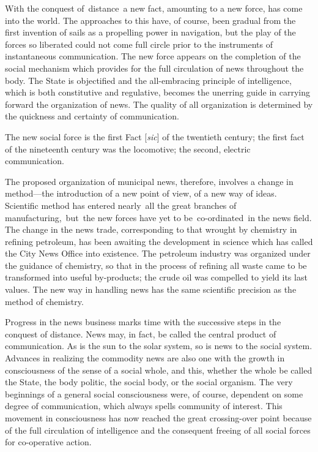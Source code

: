\documentclass[twoside,symmetric,nobib,justified]{tufte-book}
\begin{document}
With the conquest of~distance~a new fact, amounting to a new force, has
come into the world. The approaches to this have, of course, been
gradual from the first invention of sails as a propelling power in
navigation, but the play of the forces so liberated could not come full
circle prior to the instruments of instantaneous communication. The new
force appears on the completion of the social mechanism which provides
for the full circulation of news throughout the body. The State is
objectified and the all-embracing principle of intelligence, which is
both constitutive and regulative, becomes the unerring guide in carrying
forward the organization of news. The quality of all organization is
determined by the quickness and certainty of communication.~

The new social force is the first Fact {[}\emph{sic}{]} of the twentieth
century; the first fact of the nineteenth century was the locomotive;
the second, electric communication.~

The proposed organization of municipal news, therefore, involves a
change in method---the introduction of a new point of view, of a new way
of ideas. Scientific method has entered nearly~all the great branches of
manufacturing,~but~the new forces have yet to be~co-ordinated~in the
news field. The change in the news trade, corresponding to that wrought
by chemistry in refining petroleum, has been awaiting the development in
science which has called the City News Office into existence. The
petroleum industry was organized under the guidance of chemistry, so
that in the process of refining all waste came to be transformed into
useful by-products; the crude oil was compelled to yield its last
values. The new way in handling news has the same scientific precision
as the method of chemistry.~

Progress in the news business marks time with the successive steps in
the conquest of distance. News may, in fact, be called the central
product of communication. As is the sun to the solar system, so is news
to the social system. Advances in realizing the commodity news are also
one with the growth in consciousness of the sense of a social whole, and
this, whether the whole be called the State, the body politic, the
social body, or the social organism. The very beginnings of a general
social consciousness were, of course, dependent on some degree of
communication, which always spells community of interest. This movement
in consciousness has now reached the great crossing-over point because
of the full circulation of intelligence and the consequent freeing of
all social forces for co-operative action.~
\end{document}
